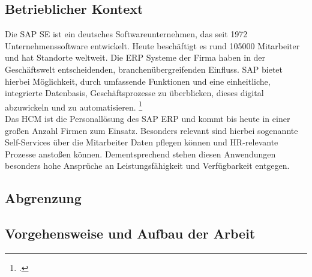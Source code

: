 \subsection{Betrieblicher Kontext}
Die SAP SE ist ein deutsches Softwareunternehmen, das seit 1972 Unternehmenssoftware entwickelt. Heute beschäftigt es rund 105000 Mitarbeiter und hat Standorte weltweit. Die \ac{ERP} Systeme der Firma haben in der Geschäftswelt entscheidenden, branchenübergreifenden Einfluss. SAP bietet hierbei Möglichkeit, durch umfassende Funktionen und eine einheitliche, integrierte Datenbasis, Geschäftsprozesse zu überblicken, dieses digital abzuwickeln und zu automatisieren. \footcite[Vgl.][]{sapse_was} \\
Das HCM ist die Personallösung des SAP ERP und kommt bis heute in einer großen Anzahl Firmen zum Einsatz. Besonders relevant sind hierbei sogenannte Self-Services über die Mitarbeiter Daten pflegen können und HR-relevante Prozesse anstoßen können. Dementsprechend stehen diesen Anwendungen besonders hohe Ansprüche an Leistungsfähigkeit und Verfügbarkeit entgegen.

\subsection{Abgrenzung}
\subsection{Vorgehensweise und Aufbau der Arbeit}    

    